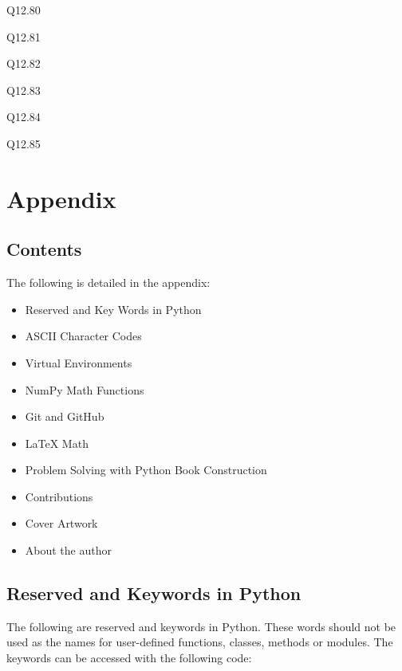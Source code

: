 \documentclass{book}
\begin{document}
Q12.80

Q12.81

Q12.82

Q12.83

Q12.84

Q12.85
    




    
        \chapter{Appendix}\label{appendix}
    




    
        \section{Contents}\label{contents}
    




    
        The following is detailed in the appendix:

\begin{itemize}
\item
  Reserved and Key Words in Python
\item
  ASCII Character Codes
\item
  Virtual Environments
\item
  NumPy Math Functions
\item
  Git and GitHub
\item
  LaTeX Math
\item
  Problem Solving with Python Book Construction
\item
  Contributions
\item
  Cover Artwork
\item
  About the author
\end{itemize}
        \newpage



    




    
        \section{Reserved and Keywords in
Python}\label{reserved-and-keywords-in-python}
    




    
        The following are reserved and keywords in Python. These words should
not be used as the names for user-defined functions, classes, methods or
modules. The keywords can be accessed with the following code:
    
\end{document}
